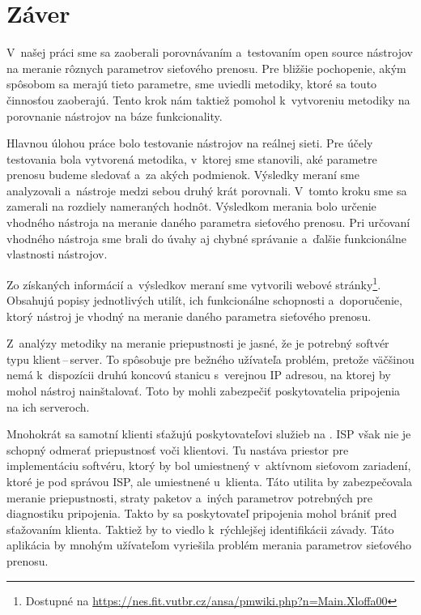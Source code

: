\chapter{Záver}
    V~našej práci sme sa zaoberali porovnávaním a~testovaním open source
    nástrojov na meranie rôznych parametrov sieťového prenosu. Pre bližšie
    pochopenie, akým spôsobom sa merajú tieto parametre, sme uviedli metodiky, 
    ktoré sa touto činnosťou zaoberajú. Tento krok nám taktiež pomohol k~vytvoreniu 
    metodiky na porovnanie nástrojov na báze funkcionality.

    Hlavnou úlohou práce bolo testovanie nástrojov na reálnej sieti. Pre
    účely testovania bola vytvorená metodika, v~ktorej sme stanovili, aké 
    parametre prenosu budeme sledovať a~za akých podmienok. Výsledky meraní
    sme analyzovali a~nástroje medzi sebou druhý krát porovnali. V~tomto kroku sme
    sa zamerali na rozdiely nameraných hodnôt. Výsledkom merania bolo určenie
    vhodného nástroja na meranie daného parametra sieťového prenosu. Pri
    určovaní vhodného nástroja sme brali do úvahy aj chybné správanie a~ďalšie
    funkcionálne vlastnosti nástrojov.

    Zo získaných informácií a~výsledkov meraní sme vytvorili
    webové stránky\footnote{Dostupné na \url{https://nes.fit.vutbr.cz/ansa/pmwiki.php?n=Main.Xloffa00}}.
    Obsahujú popisy jednotlivých utilít, ich
    funkcionálne schopnosti a~doporučenie, ktorý nástroj je vhodný na meranie
    daného parametra sieťového prenosu.

    Z~analýzy metodiky na meranie priepustnosti je jasné, že je potrebný softvér
    typu \mbox{klient\,--\,server.} To spôsobuje pre bežného užívateľa
    problém, pretože väčšinou nemá k~dispozícii druhú koncovú stanicu s~verejnou
    IP adresou, na ktorej by mohol nástroj nainštalovať. Toto by mohli zabezpečiť 
    poskytovatelia pripojenia na ich serveroch. 
    
    Mnohokrát sa samotní klienti
    sťažujú poskytovateľovi služieb na . ISP však nie
    je schopný odmerať priepustnosť voči klientovi. Tu nastáva priestor pre
    implementáciu softvéru, ktorý by bol umiestnený v~aktívnom sieťovom
    zariadení, ktoré je pod správou ISP, ale umiestnené u~klienta. Táto utilita
    by zabezpečovala meranie priepustnosti, straty paketov a~iných parametrov
    potrebných pre diagnostiku pripojenia. Takto by sa poskytovateľ pripojenia
    mohol brániť pred sťažovaním klienta. Taktiež by to
    viedlo k~rýchlejšej identifikácii závady. Táto aplikácia by mnohým
    užívateľom vyriešila problém merania parametrov sieťového prenosu. 

